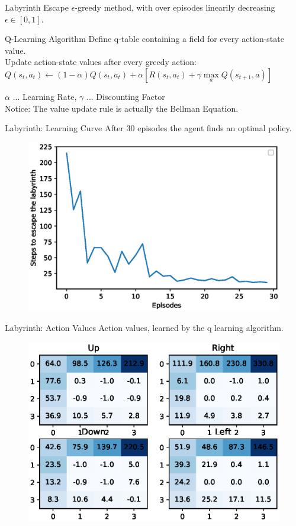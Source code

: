 \documentclass{beamer}
\begin{document}
\begin{frame}{Labyrinth Escape}
	$\epsilon$-greedy method, with over episodes linearily decreasing $\epsilon \in [0,1]$.
	\begin{exampleblock}{Q-Learning Algorithm}
	Define q-table containing a field for every action-state value.\\
	\vspace{0.3cm}
	Update action-state values after every greedy action:
	\vspace{0.3cm}
	$Q(s_t,a_t) \leftarrow (1 - \alpha) Q(s_t,a_t) + \alpha[R(s_t,a_t) + \gamma \max\limits_a Q(s_{t+1},a)]$	
	\end{exampleblock}
	$\alpha$ ... Learning Rate, $\gamma$ ... Discounting Factor \\
	Notice: The value update rule is actually the Bellman Equation. 
\end{frame}

\begin{frame}{Labyrinth: Learning Curve}
	After 30 episodes the agent finds an optimal policy.
	\begin{figure}
	\centering
	\includegraphics[width=0.7\linewidth]{Images/learning_curve.eps}\\	
	\end{figure}
\end{frame}

\begin{frame}{Labyrinth: Action Values}
	Action values, learned by the q learning algorithm.
	\begin{figure}
	\centering
	\includegraphics[width=0.7\linewidth]{Images/direction_values.eps}\\	
	\end{figure}
\end{frame}
\end{document}
